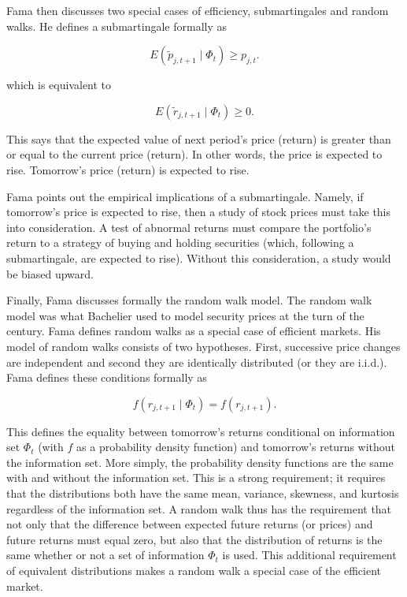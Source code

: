 Fama then discusses two special cases of efficiency,
submartingales and random walks. He defines a submartingale
formally
as

\begin{equation}
E(\tilde p_{j,t+1} \mid \Phi_{t}) \geq p_{j,t}.
\end{equation}

which is equivalent to

\begin{equation}
E(\tilde r_{j,t+1} \mid \Phi_{t}) \geq 0.
\end{equation}

This says that the expected value of next period's price (return) is greater than or equal to the current price (return). In other words, the price is expected to rise. Tomorrow's price (return) is expected to rise.


Fama points out the empirical implications of a submartingale. Namely, if tomorrow's price is expected to rise, then a study of stock prices must take this into consideration. A test of abnormal returns must compare the portfolio's return to a strategy of buying and holding securities (which, following a submartingale, are expected to rise). Without this consideration, a study would be biased upward.

Finally, Fama discusses formally the random walk model. The random walk model was what Bachelier used to model security prices at the turn of the century. Fama defines random walks as a special case of efficient markets. His model of random walks consists of two hypotheses. First, successive price changes are independent and second they are identically distributed (or they are i.i.d.). Fama defines these conditions formally as

\begin{equation}
f(r_{j,t+1} \mid \Phi_{t})=f(r_{j,t+1}).
\end{equation}

This defines the equality between tomorrow's returns conditional on information set $\Phi_{t}$ (with $f$ as a probability density function) and tomorrow's returns without the information set. More simply, the probability density functions are the same with and without the information set. This is a strong requirement; it requires that the distributions both have the same mean, variance, skewness, and kurtosis regardless of the information set. A random walk thus has the requirement that not only that the difference between expected future returns (or prices) and future returns must equal zero, but also that the distribution of returns is the same whether or not a set of information $\Phi_{t}$ is used. This additional requirement of equivalent distributions makes a random walk a special case of the efficient market.


